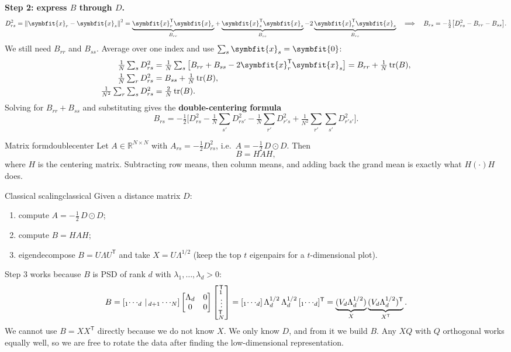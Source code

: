 \documentclass[11pt]{article}
\newcommand{\bm}[1]{\symbfit{#1}}
\newcommand{\R}{\mathbb{R}}
\newcommand{\vx}{\bm{x}}
\let\vv\relax\newcommand{\vv}{\bm{v}}
\newcommand{\T}{^{\mathsf T}}
\newcommand{\tr}{\operatorname{tr}}
\newcommand{\norm}[1]{\left\lVert #1\right\rVert}
\newcommand{\had}{\odot}
\begin{document}
\textbf{Step 2: express $B$ through $D$.}
\[
D_{rs}^2=\norm{\vx_r-\vx_s}^2=\underbrace{\vx_r\T\vx_r}_{B_{rr}}+\underbrace{\vx_s\T\vx_s}_{B_{ss}}-2\underbrace{\vx_r\T\vx_s}_{B_{rs}}
\quad\Longrightarrow\quad
B_{rs}=-\tfrac12\big[D_{rs}^2-B_{rr}-B_{ss}\big].
\]
We still need $B_{rr}$ and $B_{ss}$. Average over one index and use $\sum_s\vx_s=\bm0$:
\begin{align*}
\tfrac1N\textstyle\sum_{s}D_{rs}^2&=\tfrac1N\textstyle\sum_s\big[B_{rr}+B_{ss}-2\vx_r\T\vx_s\big]=B_{rr}+\tfrac1N\tr(B),\\
\tfrac1N\textstyle\sum_{r}D_{rs}^2&=B_{ss}+\tfrac1N\tr(B),\\
\tfrac1{N^2}\textstyle\sum_{r}\sum_sD_{rs}^2&=\tfrac2N\tr(B).
\end{align*}
Solving for $B_{rr}+B_{ss}$ and substituting gives the \textbf{double-centering formula}
\[
B_{rs}=-\tfrac12\Big[D_{rs}^2-\tfrac1N\textstyle\sum_{s'}D_{rs'}^2-\tfrac1N\sum_{r'}D_{r's}^2+\tfrac1{N^2}\sum_{r'}\sum_{s'}D_{r's'}^2\Big].
\]

\begin{proposition}{Matrix form}{doublecenter}
Let $A\in\R^{N\times N}$ with $A_{rs}=-\tfrac12D_{rs}^2$, i.e.\ $A=-\tfrac12\,D\had D$. Then
\[
B=HAH,
\]
where $H$ is the centering matrix. Subtracting row means, then column means, and adding back
the grand mean is exactly what $H(\cdot)H$ does.
\end{proposition}

\begin{algorithm}{Classical scaling}{classical}
Given a distance matrix $D$:
\begin{enumerate}[nosep,label=\arabic*)]
\item compute $A=-\tfrac12\,D\had D$;
\item compute $B=HAH$;
\item eigendecompose $B=U\Lambda U\T$ and take $X=U\Lambda^{1/2}$ (keep the top $t$ eigenpairs for a $t$-dimensional plot).
\end{enumerate}
\end{algorithm}

Step 3 works because $B$ is PSD of rank $d$ with $\lambda_1,\dots,\lambda_d>0$:
\[
B=[\vv_1\cdots\vv_d\,|\,\vv_{d+1}\cdots\vv_N]
\begin{bmatrix}\Lambda_d&0\\0&0\end{bmatrix}
\begin{bmatrix}\vv_1\T\\\vdots\\\vv_N\T\end{bmatrix}
=[\vv_1\cdots\vv_d]\,\Lambda_d^{1/2}\,\Lambda_d^{1/2}\,[\vv_1\cdots\vv_d]\T
=\underbrace{(V_d\Lambda_d^{1/2})}_{X}\underbrace{(V_d\Lambda_d^{1/2})\T}_{X\T}.
\]
We cannot use $B=XX\T$ directly because we do not know $X$. We only know $D$, and
from it we build $B$. Any $XQ$ with $Q$ orthogonal works equally well, so we are free
to rotate the data after finding the low-dimensional representation.
\end{document}
